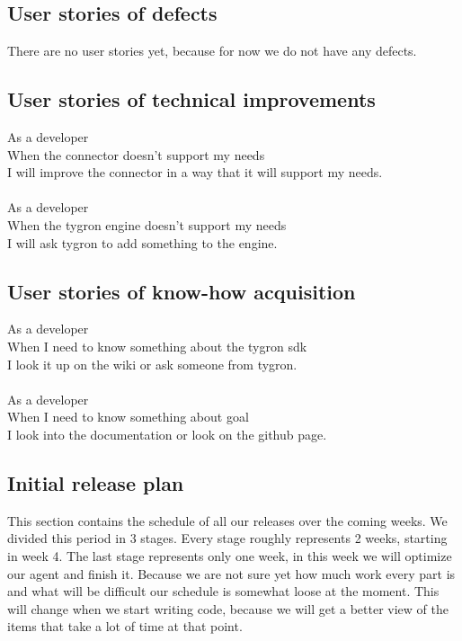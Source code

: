 \subsection{User stories of defects}
There are no user stories yet, because for now we do not have any defects.

\subsection{User stories of technical improvements}
As a developer\\
When the connector doesn't support my needs\\
I will improve the connector in a way that it will support my needs.\\
\\
As a developer\\
When the tygron engine doesn't support my needs\\
I will ask tygron to add something to the engine.

\subsection{User stories of know-how acquisition}
As a developer\\
When I need to know something about the tygron sdk\\
I look it up on the wiki or ask someone from tygron.\\
\\
As a developer\\
When I need to know something about goal\\
I look into the documentation or look on the github page.


\subsection{Initial release plan}

This section contains the schedule of all our releases over the coming weeks. We divided this period in 3 stages. Every stage roughly represents 2 weeks, starting in week 4. The last stage represents only one week, in this week we will optimize our agent and finish it. Because we are not sure yet how much work every part is and what will be difficult our schedule is somewhat loose at the moment. This will change when we start writing code, because we will get a better view of the items that take a lot of time at that point.\\
\\

